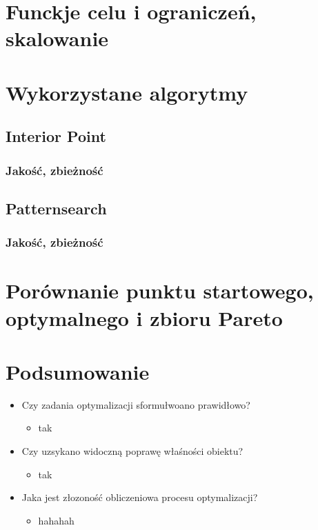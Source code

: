 \documentclass{article}
\begin{document}
\section{Funckje celu i ograniczeń, skalowanie}
\section{Wykorzystane algorytmy}
\subsection{Interior Point}
\subsubsection*{Jakość, zbieżność}
\subsection{Patternsearch}
\subsubsection*{Jakość, zbieżność}
\section{Porównanie punktu startowego, optymalnego i zbioru Pareto}
\section{Podsumowanie}
\begin{itemize}
	\item Czy zadania optymalizacji sformułwoano prawidłowo?
	      \begin{itemize}
		      \item tak
	      \end{itemize}
	\item Czy uzsykano widoczną poprawę właśności obiektu?
	      \begin{itemize}
		      \item tak
	      \end{itemize}

	\item Jaka jest złozoność obliczeniowa procesu optymalizacji?
	      \begin{itemize}
		      \item hahahah
	      \end{itemize}

\end{itemize}
\end{document}
